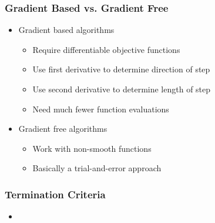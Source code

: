 \documentclass[11pt]{beamer}
\begin{document}
\begin{frame}[c]\frametitle{Gradient Based vs. Gradient Free}
    \begin{itemize}
        \item Gradient based algorithms
        \begin{itemize}
            \item Require differentiable objective functions
            \item Use first derivative to determine direction of step
            \item Use second derivative to determine length of step
            \item Need much fewer function evaluations
        \end{itemize}
        \item Gradient free algorithms
        \begin{itemize}
            \item Work with non-smooth functions
            \item Basically a trial-and-error approach
        \end{itemize}
    \end{itemize}
\end{frame}



\begin{frame}[c]\frametitle{Termination Criteria}
    \begin{itemize}
        \item
    \end{itemize}
\end{frame}
\end{document}
